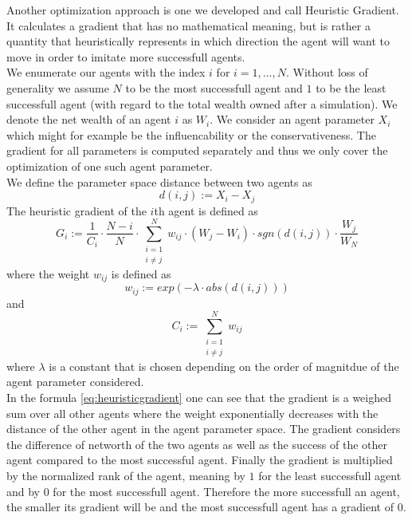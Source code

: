 \documentclass[11pt]{article}
\begin{document}
Another optimization approach is one we developed and call Heuristic Gradient. It calculates a gradient that has no mathematical meaning, but is rather a quantity that heuristically represents in which direction the agent will want to move in order to imitate more successfull agents. \\
We enumerate our agents with the index $i$ for $i=1,...,N$. Without loss of generality we assume $N$ to be the most successfull agent and $1$ to be the least successfull agent (with regard to the total wealth owned after a simulation). We denote the net wealth of an agent $i$ as $W_i$. We consider an agent parameter $X_i$ which might for example be the influencability or the conservativeness. The gradient for all parameters is computed separately and thus we only cover the optimization of one such agent parameter. \\
We define the parameter space distance between two agents as
\begin{equation}
  d(i,j):=X_i-X_j
\end{equation}
The heuristic gradient of the $i$th agent is defined as \\
\begin{equation}\label{eq:heuristicgradient}
  G_i:=\frac{1}{C_i}\cdot \frac{N-i}{N} \cdot \sum\limits_{\substack{i=1 \\ i\neq j}}^{N}{ w_{ij} \cdot (W_j - W_i) \cdot sgn(d(i,j)) \cdot \frac{W_j}{W_N} }
\end{equation}
where the weight $w_{ij}$ is defined as
\begin{equation}
  w_{ij}:=exp(-\lambda \cdot abs(d(i,j)))
\end{equation}
and
\begin{equation}
  C_i:=\sum\limits_{\substack{i=1 \\ i\neq j}}^{N}{w_{ij}}
\end{equation}
where $\lambda$ is a constant that is chosen depending on the order of magnitdue of the agent parameter considered. \\
In the formula \ref{eq:heuristicgradient} one can see that the gradient is a weighed sum over all other agents where the weight exponentially decreases with the distance of the other agent in the agent parameter space. The gradient considers the difference of networth of the two agents as well as the success of the other agent compared to the most successful agent. Finally the gradient is multiplied by the normalized rank of the agent, meaning by $1$ for the least successfull agent and by $0$ for the most successfull agent. Therefore the more successfull an agent, the smaller its gradient will be and the most successfull agent has a gradient of $0$. \\
\end{document}
